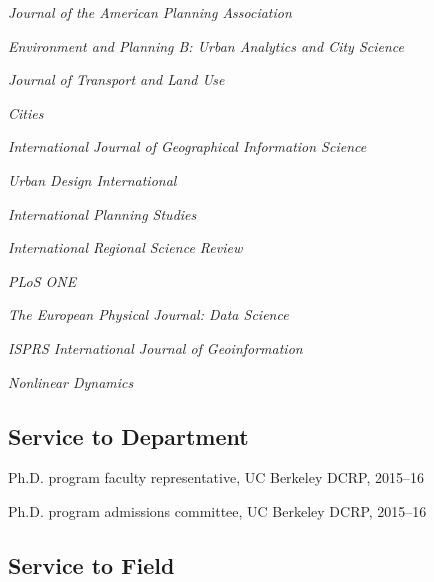 \documentclass[12pt,letterpaper]{report}
\newcommand{\listitemspace}{0.15em}
\renewenvironment{itemize}
{\begin{list}{}{\setlength{\leftmargin}{0em}
				\setlength{\parskip}{0em}
				\setlength{\itemsep}{\listitemspace}
				\setlength{\parsep}{\listitemspace}}}
{\end{list}}
\begin{document}
\begin{itemize}

\item \textit{Journal of the American Planning Association}

\item \textit{Environment and Planning B: Urban Analytics and City Science}

\item \textit{Journal of Transport and Land Use}

\item \textit{Cities}

\item \textit{International Journal of Geographical Information Science}

\item \textit{Urban Design International}

\item \textit{International Planning Studies}

\item \textit{International Regional Science Review}

\item \textit{PLoS ONE}

\item \textit{The European Physical Journal: Data Science}

\item \textit{ISPRS International Journal of Geoinformation}

\item \textit{Nonlinear Dynamics}

\end{itemize}

\subsection*{Service to Department}

\begin{itemize}
	
\item Ph.D. program faculty representative, UC Berkeley DCRP, 2015--16

\item Ph.D. program admissions committee, UC Berkeley DCRP, 2015--16

\end{itemize}

\subsection*{Service to Field}
\end{document}
